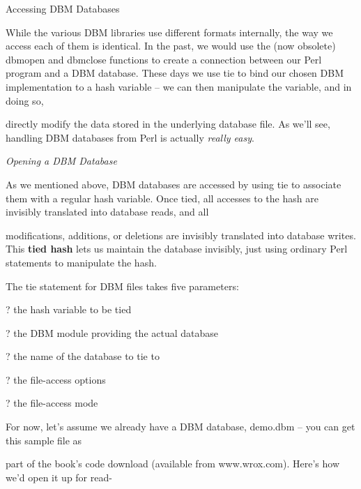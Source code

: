 \documentclass[a4paper,11pt]{book}
\begin{document}
\noindent Accessing DBM Databases

\noindent 

\noindent While the various DBM libraries use different formats internally, the way we access each of them is identical. In the past, we would use the (now obsolete) dbmopen and dbmclose functions to create a connection between our Perl program and a DBM database. These days we use tie to bind our chosen DBM implementation to a hash variable -- we can then manipulate the variable, and in doing so,

\noindent directly modify the data stored in the underlying database file. As we'll see, handling DBM databases from Perl is actually \textit{really easy}.

\noindent 

\noindent \textit{Opening a DBM Database}

\noindent As we mentioned above, DBM databases are accessed by using tie to associate them with a regular hash variable. Once tied, all accesses to the hash are invisibly translated into database reads, and all

\noindent modifications, additions, or deletions are invisibly translated into database writes. This \textbf{tied hash }lets us maintain the database invisibly, just using ordinary Perl statements to manipulate the hash.

\noindent 

\noindent The tie statement for DBM files takes five parameters:

\noindent 

\noindent ? the hash variable to be tied

\noindent 

\noindent ? the DBM module providing the actual database

\noindent 

\noindent ? the name of the database to tie to

\noindent 

\noindent ? the file-access options

\noindent 

\noindent ? the file-access mode

\noindent 

\noindent For now, let's assume we already have a DBM database, demo.dbm -- you can get this sample file as

\noindent part of the book's code download (available from www.wrox.com). Here's how we'd open it up for read-
\end{document}
